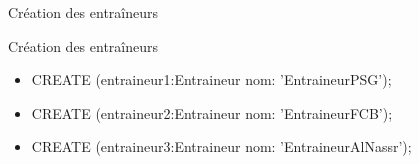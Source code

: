 \begin{frame}{Création des entraîneurs}
  \begin{block}{Création des entraîneurs}
    \begin{itemize}
      \item CREATE (entraineur1:Entraineur {nom: 'EntraineurPSG'});
      \item CREATE (entraineur2:Entraineur {nom: 'EntraineurFCB'});
      \item CREATE (entraineur3:Entraineur {nom: 'EntraineurAlNassr'});
    \end{itemize}
  \end{block}
\end{frame}
